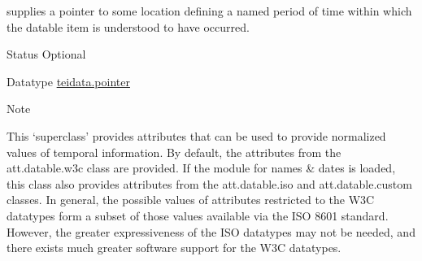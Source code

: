 \begin{reflist}
\begin{sansreflist}
  supplies a pointer to some location defining a named period of time within which the datable item is understood to have occurred.
\begin{reflist}
    \item[{Status}]
  Optional
    \item[{Datatype}]
  \hyperref[TEI.teidata.pointer]{teidata.pointer}
\end{reflist}  
\end{sansreflist}  
    \item[{Note}]
  \par
This ‘superclass’ provides attributes that can be used to provide normalized values of temporal information. By default, the attributes from the \textsf{att.datable.w3c} class are provided. If the module for names \& dates is loaded, this class also provides attributes from the \textsf{att.datable.iso} and \textsf{att.datable.custom} classes. In general, the possible values of attributes restricted to the W3C datatypes form a subset of those values available via the ISO 8601 standard. However, the greater expressiveness of the ISO datatypes may not be needed, and there exists much greater software support for the W3C datatypes.
\end{reflist}  

